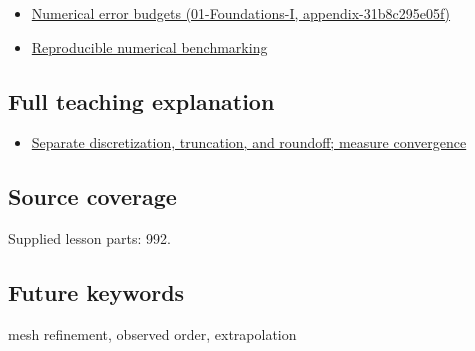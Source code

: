 \begin{itemize}
\tightlist
\item
  \href{../01-Foundations-I/main.pdf\#nameddest=appendix-31b8c295e05f}{Numerical error budgets (01-Foundations-I, appendix-31b8c295e05f)}
\item
  \hyperref[appendix-b9db93e28371]{Reproducible numerical benchmarking}
\end{itemize}

\subsection{Full teaching explanation}\label{appendix-aca80b6bf17a-full-teaching-explanation}

\begin{itemize}
\tightlist
\item
  \hyperref[02-foundations-ii-ch029-separate-discretization-truncation-and-roundoff-measure-convergence]{Separate discretization, truncation, and roundoff; measure convergence}
\end{itemize}

\subsection{Source coverage}\label{appendix-aca80b6bf17a-source-coverage}

Supplied lesson parts: 992.

\subsection{Future keywords}\label{appendix-aca80b6bf17a-future-keywords}

mesh refinement, observed order, extrapolation
